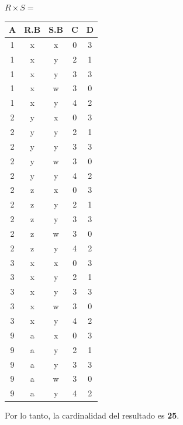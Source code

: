 \begin{center}
$R \times S =$ \quad
\begin{tabular}{|c|c|c|c|c|}
\hline
\textbf{A} & \textbf{R.B} & \textbf{S.B} & \textbf{C} & \textbf{D} \\ \hline
  1 & x & x & 0 & 3 \\
  1 & x & y & 2 & 1 \\
  1 & x & y & 3 & 3 \\
  1 & x & w & 3 & 0 \\
  1 & x & y & 4 & 2 \\ \hline
  2 & y & x & 0 & 3 \\
  2 & y & y & 2 & 1 \\
  2 & y & y & 3 & 3 \\
  2 & y & w & 3 & 0 \\
  2 & y & y & 4 & 2 \\ \hline
  2 & z & x & 0 & 3 \\
  2 & z & y & 2 & 1 \\
  2 & z & y & 3 & 3 \\
  2 & z & w & 3 & 0 \\
  2 & z & y & 4 & 2 \\ \hline
  3 & x & x & 0 & 3 \\
  3 & x & y & 2 & 1 \\
  3 & x & y & 3 & 3 \\
  3 & x & w & 3 & 0 \\
  3 & x & y & 4 & 2 \\ \hline
  9 & a & x & 0 & 3 \\
  9 & a & y & 2 & 1 \\
  9 & a & y & 3 & 3 \\
  9 & a & w & 3 & 0 \\
  9 & a & y & 4 & 2 \\ \hline
\end{tabular}
\end{center}

Por lo tanto, la cardinalidad del resultado es \textbf{25}.
